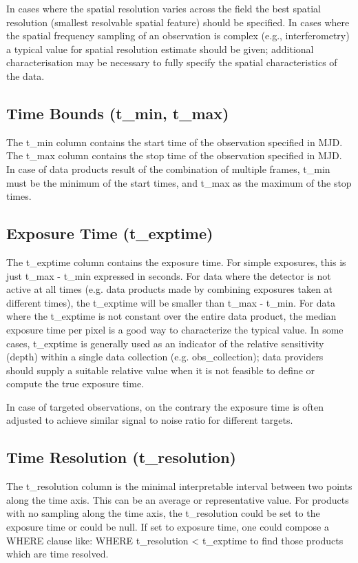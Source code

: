 \documentclass[11pt,a4paper]{ivoa}
\begin{document}
In cases where the spatial resolution varies across the field the best spatial resolution (smallest resolvable spatial
feature) should be specified.  In cases where the spatial frequency sampling of an observation is complex (e.g.,
interferometry) a typical value for spatial resolution estimate should be given; additional characterisation may be
necessary to fully specify the spatial characteristics of the data.

\subsection{Time Bounds (t\_min, t\_max)}
\label{bkm:Ref285666427}The t\_min column contains the start time of the observation specified in MJD.  The t\_max
column contains the stop time of the observation specified in MJD.  In case of data products result of the combination
of multiple frames, t\_min must be the minimum of the start times, and t\_max as the maximum of the stop times.

\subsection{Exposure Time (t\_exptime)}
\label{bkm:Ref285666434}The t\_exptime column contains the exposure time.  For simple exposures, this is just t\_max -
t\_min expressed in seconds. For data where the detector is not active at all times (e.g. data products made by
combining exposures taken at different times), the t\_exptime will be smaller than t\_max - t\_min.  For data where the
t\_exptime is not constant over the entire data product, the median exposure time per pixel is a good way to
characterize the typical value. In some cases,  t\_exptime is generally used as an indicator of the relative
sensitivity (depth) within a single data collection (e.g. obs\_collection); data providers should supply a suitable
relative value when it is not feasible to define or compute the true exposure time.

In case of targeted observations, on the contrary the exposure time is often adjusted to achieve similar signal to noise
ratio for different targets. 

\subsection{Time Resolution (t\_resolution)}
The t\_resolution column is the minimal interpretable interval between two points along the time axis.  This can be an
average or representative value.  For products with no sampling along the time axis, the t\_resolution could be set to
the exposure time or could be null.  If set to exposure time, one could compose a WHERE clause like: WHERE
t\_resolution {\textless} t\_exptime  to find those products which are time resolved.
\end{document}
